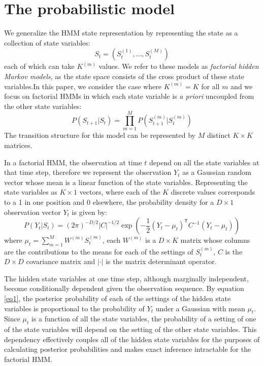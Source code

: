 \documentclass{article}
\begin{document}
\section{The probabilistic model}
We generalize the HMM state representation by representing the state as a collection of state variables:
\[ S_t = (S_t^{(1)},\dots,S_t^{(M)}) \]
each of which can take $K^{(m)}$ values. We refer to these models as \emph{factorial hidden Markov models}, as the state space consists of the cross product of these state variables.In this paper, we consider the case where $K^{(m)} = K$ for all $m$ and we focus on factorial HMMs in which each state variable is \emph{a priori} uncoupled from the other state variables:
\[ P(S_{t+1}|S_t) = \prod_{m=1}^M P(S_{t+1}^{(m)}|S_t^{(m)}) \]
The transition structure for this model can be represented by $M$ distinct $K \times K$ matrices.

In a factorial HMM, the observation at time $t$ depend on all the state variables at that time step, therefore we represent the observation $Y_t$ as a Gaussian random vector whose mean is a linear function of the state variables. Representing the state variables as $K \times 1$ vectors, where each of the $K$ discrete values corresponds to a 1 in one position and 0 elsewhere, the probability density for a $D \times 1$ observation vector $Y_t$ is given by:
\begin{equation}
P(Y_t|S_t) = (2 \pi)^{-D/2} \left| C \right|^{-1/2} \exp \left( -\frac{1}{2} (Y_t - \mu_t)^\mathsf{T} C^{-1} (Y_t - \mu_t) \right)
\label{eq1}
\end{equation}  
where $\mu_t = \sum_{m=1}^M W^{(m)} S_t^{(m)}$, each $W^{(m)}$ is a $D \times K$ matrix whose columns are the contributions to the means for each of the settings of $S_t^{(m)}$, $C$ is the $D \times D$ covariance matrix and $\left| \cdot \right|$ is the matrix determinant operator.

The hidden state variables at one time step, although marginally independent, become conditionally dependent given the observation sequence. By equation \ref{eq1}, the posterior probability of each of the settings of the hidden state variables is proportional to the probability of $Y_t$ under a Gaussian with mean $\mu_t$. Since $\mu_t$ is a function of all the state variables, the probability of a setting of one of the state variables will depend on the setting of the other state variables. This dependency effectively couples all of the hidden state variables for the purposes of calculating posterior probabilities and makes exact inference intractable for the factorial HMM.
\end{document}
